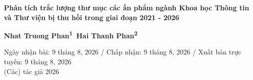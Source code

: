 \vspace{36pt}
{
\setlength{\parindent}{0pt}


\begin{minipage}{\dimexpr\textwidth-0.5in\relax}
    \raggedright
    \LARGE\bfseries\robotocondensed
    Phân tích trắc lượng thư mục các ấn phẩm ngành Khoa học Thông tin và Thư viện bị thu hồi trong giai đoạn 2021 - 2026
\end{minipage}

\vspace{24pt}

{\bfseries\sffamily\large
    Nhat Truong Phan\textsuperscript{1}\,\href{https://orcid.org/0000-0000-0000-0001}{\color{orcidgreen}\faOrcid} \keywordseparator 
    Hai Thanh Phan\textsuperscript{2}\,\href{https://orcid.org/0000-0000-0000-0002}{\color{orcidgreen}\faOrcid}
}

\vspace{24pt}

{\small \robotocondensed
    Ngày nhận bài: 9 tháng 8, 2026 / Chấp nhận: 9 tháng 8, 2026 / Xuất bản trực tuyến: 9 tháng 8, 2026\\
    \textcopyright{} (Các) tác giả 2026
}

\vspace{24pt}
}

\let\thefootnote\relax
{}
